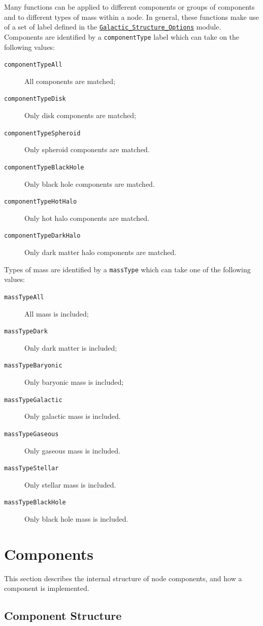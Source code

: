 Many functions can be applied to different components or groups of components and to different types of mass within a node. In general, these functions make use of a set of label defined in the \hyperlink{galactic_structure.options.F90:galactic_structure_options}{{\tt Galactic\_Structure\_Options}} module. Components are identified by a {\tt componentType} label which can take on the following values:
\begin{description}
 \item [{\tt componentTypeAll}] All components are matched;
 \item [{\tt componentTypeDisk}] Only disk components are matched;
 \item [{\tt componentTypeSpheroid}] Only spheroid components are matched.
 \item [{\tt componentTypeBlackHole}] Only black hole components are matched.
 \item [{\tt componentTypeHotHalo}] Only hot halo components are matched.
 \item [{\tt componentTypeDarkHalo}] Only dark matter halo components are matched.
\end{description}
Types of mass are identified by a {\tt massType} which can take one of the following values:
\begin{description}
 \item [{\tt massTypeAll}] All mass is included;
 \item [{\tt massTypeDark}] Only dark matter is included;
 \item [{\tt massTypeBaryonic}] Only baryonic mass is included;
 \item [{\tt massTypeGalactic}] Only galactic mass is included.
 \item [{\tt massTypeGaseous}] Only gaseous mass is included.
 \item [{\tt massTypeStellar}] Only stellar mass is included.
 \item [{\tt massTypeBlackHole}] Only black hole mass is included.
\end{description}

\section{Components}

This section describes the internal structure of node components, and how a component is implemented.

\subsection{Component Structure}


